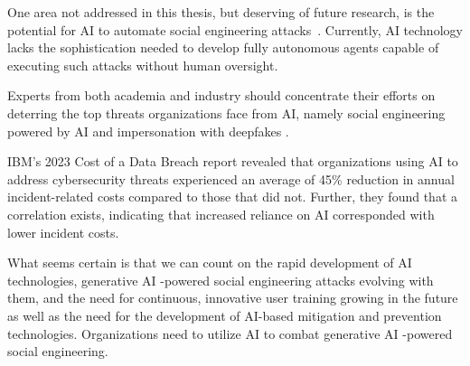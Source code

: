 


One area not addressed in this thesis, but deserving of future research, is the potential for AI to automate social engineering attacks~\citep{mirsky_Threat_Offensive_AI_Organizations_2023}. Currently, AI technology lacks the sophistication needed to develop fully autonomous agents capable of executing such attacks without human oversight.


Experts from both academia and industry should concentrate their efforts on deterring the top threats organizations face from AI, namely social engineering powered by AI and impersonation with deepfakes \citep{mirsky_Threat_Offensive_AI_Organizations_2023}.

IBM's 2023 Cost of a Data Breach report revealed that organizations using AI to address cybersecurity threats experienced an average of 45\% reduction in annual incident-related costs compared to those that did not. Further, they found that a correlation exists, indicating that increased reliance on AI corresponded with lower incident costs.

What seems certain is that we can count on the rapid development of AI technologies, generative AI -powered social engineering attacks evolving with them, and the need for continuous, innovative user training growing in the future as well as the need for the development of AI-based mitigation and prevention technologies. Organizations need to utilize AI to combat generative AI -powered social engineering.




